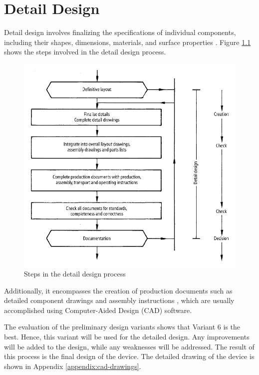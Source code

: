 \chapter{Detail Design}
\label{ch:detail_design}
Detail design involves finalizing the specifications of individual components, including their shapes, dimensions, materials, and surface properties \cite[436]{Pahl2007}. Figure \ref{fig:detail_design_steps} shows the steps involved in the detail design process.

\begin{figure}[!ht]
    \centering
    \includegraphics[width=0.95\linewidth]{texs/Part1/chapter4/image/detaildesignstep.png}
    \caption{Steps in the detail design process}
    \label{fig:detail_design_steps}
\end{figure}

Additionally, it encompasses the creation of production documents such as detailed component drawings and assembly instructions \cite[436]{Pahl2007}, which are usually accomplished using Computer-Aided Design (CAD) software.

The evaluation of the preliminary design variants shows that Variant 6 is the best. Hence, this variant will be used for the detailed design. Any improvements will be added to the design, while any weaknesses will be addressed. The result of this process is the final design of the device. The detailed drawing of the device is shown in Appendix \ref{appendix:cad-drawings}.

